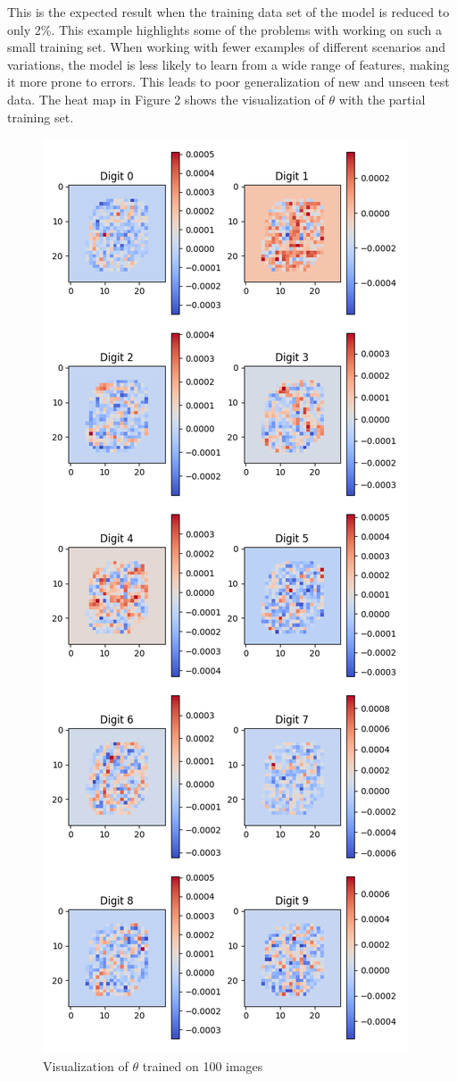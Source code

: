 \documentclass[conference]{IEEEtran}
\begin{document}
This is the expected result when the training data set of the model is reduced to only 2\%. This example highlights some of the problems with working on such a small training set. When working with fewer examples of different scenarios and variations, the model is less likely to learn from a wide range of features, making it more prone to errors. This leads to poor generalization of new and unseen test data. The heat map in Figure 2 shows the visualization of $\theta$ with the partial training set. 

\begin{figure}
    \centering
    \includegraphics[width=0.75\linewidth]{theta_fig2.png}
    \caption{Visualization of $\theta$ trained on 100 images}
    \label{fig:enter-label}
\end{figure}
\end{document}
